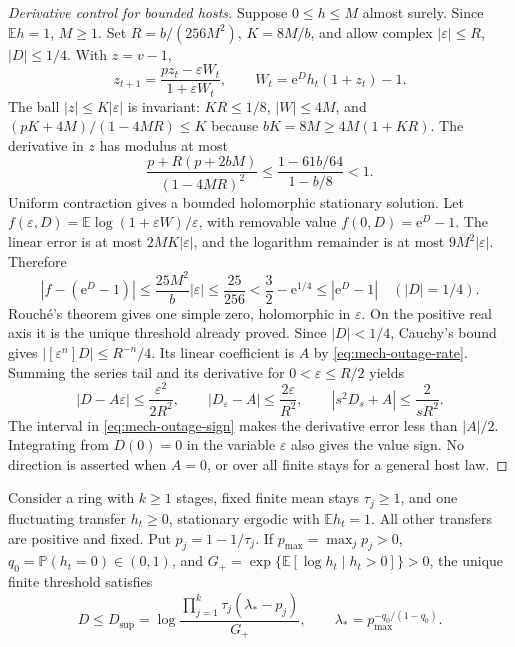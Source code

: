 \begin{proof}[Derivative control for bounded hosts]
Suppose \(0\leq h\leq M\) almost surely. Since \(\mathbb E h=1\), \(M\geq1\). Set \(R=b/(256M^2)\), \(K=8M/b\), and allow complex \(|\varepsilon|\leq R\), \(|D|\leq1/4\). With \(z=v-1\),
\begin{equation}\label{eq:mech-outage-complex}
 z_{t+1}=\frac{pz_t-\varepsilon W_t}{1+\varepsilon W_t},
 \qquad W_t=\mathrm e^D h_t(1+z_t)-1.
\end{equation}
The ball \(|z|\leq K|\varepsilon|\) is invariant: \(KR\leq1/8\), \(|W|\leq4M\), and
\((pK+4M)/(1-4MR)\leq K\) because \(bK=8M\geq4M(1+KR)\).
The derivative in \(z\) has modulus at most
\begin{equation}\label{eq:mech-outage-complex-bound}
 \frac{p+R(p+2bM)}{(1-4MR)^2}
 \leq\frac{1-61b/64}{1-b/8}<1.
\end{equation}
Uniform contraction gives a bounded holomorphic stationary solution. Let
\(f(\varepsilon,D)=\mathbb E\log(1+\varepsilon W)/\varepsilon\), with removable value \(f(0,D)=\mathrm e^D-1\). The linear error is at most \(2MK|\varepsilon|\), and the logarithm remainder is at most \(9M^2|\varepsilon|\). Therefore
\begin{equation}\label{eq:mech-outage-rouche}
 |f-(\mathrm e^D-1)|\leq\frac{25M^2}{b}|\varepsilon|
 \leq\frac{25}{256}<\frac32-\mathrm e^{1/4}
 \leq|\mathrm e^D-1|\quad (|D|=1/4).
\end{equation}
Rouch\'e's theorem gives one simple zero, holomorphic in \(\varepsilon\). On the positive real axis it is the unique threshold already proved. Since \(|D|<1/4\), Cauchy's bound gives \(|[\varepsilon^n]D|\leq R^{-n}/4\). Its linear coefficient is \(A\) by \eqref{eq:mech-outage-rate}. Summing the series tail and its derivative for \(0<\varepsilon\leq R/2\) yields
\begin{equation}\label{eq:mech-outage-derivative}
 |D-A\varepsilon|\leq\frac{\varepsilon^2}{2R^2},\qquad
 |D_\varepsilon-A|\leq\frac{2\varepsilon}{R^2},\qquad
 |s^2D_s+A|\leq\frac{2}{sR^2}.
\end{equation}
The interval in \eqref{eq:mech-outage-sign} makes the derivative error less than \(|A|/2\). Integrating from \(D(0)=0\) in the variable \(\varepsilon\) also gives the value sign. No direction is asserted when \(A=0\), or over all finite stays for a general host law.
\end{proof}

\begin{proposition}\label{prop:mech-outage-bound}
Consider a ring with \(k\geq1\) stages, fixed finite mean stays \(\tau_j\geq1\), and one fluctuating transfer \(h_t\geq0\), stationary ergodic with \(\mathbb E h_t=1\). All other transfers are positive and fixed. Put \(p_j=1-1/\tau_j\). If \(p_{\max}=\max_jp_j>0\), \(q_0=\mathbb P(h_t=0)\in(0,1)\), and \(G_+=\exp\{\mathbb E[\log h_t\mid h_t>0]\}>0\), the unique finite threshold satisfies
\begin{equation}\label{eq:mech-outage-bound}
 D\leq D_{\mathrm{sup}}=\log\frac{\prod_{j=1}^k\tau_j(\lambda_*-p_j)}{G_+},
 \qquad \lambda_*=p_{\max}^{-q_0/(1-q_0)}.
\end{equation}
\end{proposition}

